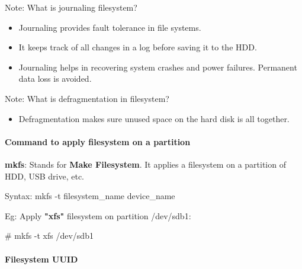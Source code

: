 \begin{flushleft}
\newpage
\begin{tcolorbox}[breakable,notitle,boxrule=1pt,colback=yellow,colframe=yellow]
	\color{black}
	Note: What is journaling filesystem?
	\begin{itemize}
		\item Journaling provides fault tolerance in file systems.
		\item It keeps track of all changes in a log before saving it to the HDD.
		\item Journaling helps in recovering system crashes and power failures. Permanent data loss is avoided.
	\end{itemize}
\end{tcolorbox}

\begin{tcolorbox}[breakable,notitle,boxrule=1pt,colback=yellow,colframe=yellow]
	\color{black}
	Note: What is defragmentation in filesystem?
	\begin{itemize}
		\item Defragmentation makes sure unused space on the hard disk is all together.
	\end{itemize}
\end{tcolorbox}

\newpage
\paragraph{Command to apply filesystem on a partition}
\textbf{mkfs}: Stands for \textbf{Make Filesystem}. It applies a filesystem on a partition of HDD, USB drive, etc.

\bigskip
\begin{tcolorbox}[breakable,notitle,boxrule=-0pt,colback=pink,colframe=pink]
	\color{black}
	\font=9pt
	Syntax: mkfs -t filesystem\_name device\_name
	\font=4pt
\end{tcolorbox}

Eg: Apply \textbf{"xfs"} filesystem on partition /dev/sdb1:
\begin{tcolorbox}[breakable,notitle,boxrule=-0pt,colback=black,colframe=black]
	\color{green}
	\font=9pt
	\# mkfs -t xfs /dev/sdb1
	\font=4pt
\end{tcolorbox}

\bigskip
\bigskip

\paragraph{Filesystem UUID}


\end{flushleft}
